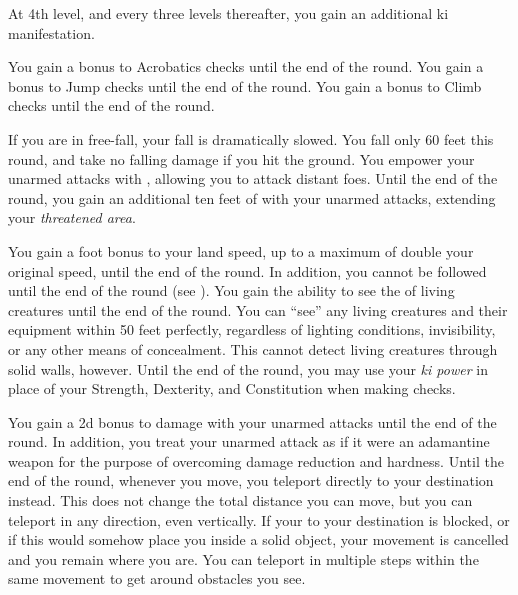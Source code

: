             At 4th level, and every three levels thereafter, you gain an additional ki manifestation.

            You gain a  bonus to Acrobatics checks until the end of the round.
            You gain a  bonus to Jump checks until the end of the round.
            You gain a  bonus to Climb checks until the end of the round.

            If you are in free-fall, your fall is dramatically slowed.
            You fall only 60 feet this round, and take no falling damage if you hit the ground.
            You empower your unarmed attacks with \ki, allowing you to attack distant foes.
            Until the end of the round, you gain an additional ten feet of  with your unarmed attacks, extending your \textit{threatened area}.

            You gain a  foot bonus to your land speed, up to a maximum of double your original speed, until the end of the round.
            In addition, you cannot be followed until the end of the round (see ).
            You gain the ability to see the \ki of living creatures until the end of the round.
            You can ``see'' any living creatures and their equipment within 50 feet perfectly, regardless of lighting conditions, invisibility, or any other means of concealment.
            This cannot detect living creatures through solid walls, however.
            Until the end of the round, you may use your \textit{ki power} in place of your Strength, Dexterity, and Constitution when making checks.

            You gain a \plus2d bonus to damage with your unarmed attacks until the end of the round.
            In addition, you treat your unarmed attack as if it were an adamantine weapon for the purpose of overcoming damage reduction and hardness.
            Until the end of the round, whenever you move, you teleport directly to your destination instead.
            This does not change the total distance you can move, but you can teleport in any direction, even vertically.
            If your  to your destination is blocked, or if this would somehow place you inside a solid object, your movement is cancelled and you remain where you are.
            You can teleport in multiple steps within the same movement to get around obstacles you see.

